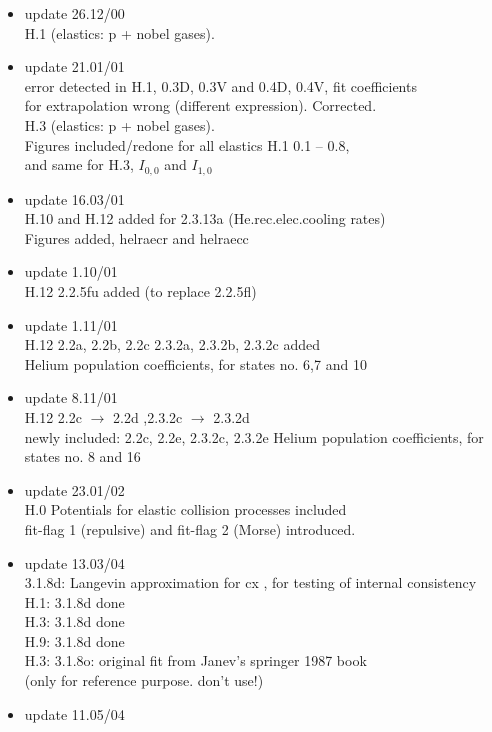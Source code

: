 \documentclass[12pt,dvips]{article}
\begin{document}
\begin{itemize}
  H.2 2.26B0 and H.2 2.26B1 added (ionization rates for Iron).
 \item update  26.12/00 \\
  H.1 (elastics: p + nobel gases).
 \item update  21.01/01 \\
  error detected in H.1, 0.3D, 0.3V and 0.4D, 0.4V, fit coefficients\\
  for extrapolation wrong (different expression). Corrected.\\
  H.3 (elastics: p + nobel gases).\\
  Figures included/redone for all elastics H.1  0.1 -- 0.8, \\
  and same for H.3, $I_{0,0}$ and $I_{1,0}$
 \item update  16.03/01 \\
  H.10 and H.12 added for 2.3.13a (He.rec.elec.cooling rates)\\
  Figures added, helraecr and helraecc
 \item update  1.10/01 \\
  H.12  2.2.5fu added (to replace 2.2.5fl)
 \item update  1.11/01 \\
  H.12  2.2a, 2.2b, 2.2c 2.3.2a, 2.3.2b, 2.3.2c added \\
  Helium population coefficients, for states no. 6,7 and 10
 \item update  8.11/01 \\
  H.12  2.2c $\rightarrow$ 2.2d ,2.3.2c $\rightarrow$ 2.3.2d \\
  newly included: 2.2c, 2.2e,  2.3.2c,  2.3.2e
  Helium population coefficients, for states no. 8 and 16
 \item update  23.01/02 \\
  H.0  Potentials for elastic collision processes included\\
  fit-flag 1 (repulsive) and fit-flag 2 (Morse) introduced.
 \item update  13.03/04 \\
  3.1.8d: Langevin approximation for cx , for testing of internal consistency\\
  H.1:  3.1.8d done  \\
  H.3:  3.1.8d done   \\
  H.9:  3.1.8d done   \\
  H.3:  3.1.8o:  original fit from Janev's springer 1987 book\\
  (only for reference purpose. don't use!)
 \item update  11.05/04 \\

\end{itemize}
\end{document}
